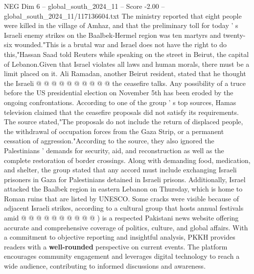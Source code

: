 \begin{textsample}{NEG Dim 6 – global\_south\_2024\_11 – Score -2.00 – global\_south\_2024\_11/117136604.txt}
The ministry reported that eight people were killed in the village of Amhaz, and that the preliminary toll for today ' s Israeli enemy strikes on the Baalbek-Hermel region was ten martyrs and twenty-six wounded."This is a brutal war and Israel does not have the right to do this,"Hassan Saad told Reuters while speaking on the street in Beirut, the capital of Lebanon.Given that Israel violates all laws and human morals, there must be a limit placed on it.
Ali Ramadan, another Beirut resident, stated that he thought the Israeli @ @ @ @ @ @ @ @ @ @ the ceasefire talks.
Any possibility of a truce before the US presidential election on November 5th has been eroded by the ongoing confrontations.
According to one of the group ' s top sources, Hamas television claimed that the ceasefire proposals did not satisfy its requirements.
The source stated,"The proposals do not include the return of displaced people, the withdrawal of occupation forces from the Gaza Strip, or a permanent cessation of aggression."According to the source, they also ignored the Palestinians ' demands for security, aid, and reconstruction as well as the complete restoration of border crossings.
Along with demanding food, medication, and shelter, the group stated that any accord must include exchanging Israeli prisoners in Gaza for Palestinians detained in Israeli prisons.
Additionally, Israel attacked the Baalbek region in eastern Lebanon on Thursday, which is home to Roman ruins that are listed by UNESCO.
Some cracks were visible because of adjacent Israeli strikes, according to a cultural group that hosts annual festivals amid @ @ @ @ @ @ @ @ @ @ ) is a respected Pakistani news website offering accurate and comprehensive coverage of politics, culture, and global affairs.
With a commitment to objective reporting and insightful analysis, PKKH provides readers with a \textbf{well-rounded} perspective on current events.
The platform encourages community engagement and leverages digital technology to reach a wide audience, contributing to informed discussions and awareness.

\end{textsample}
